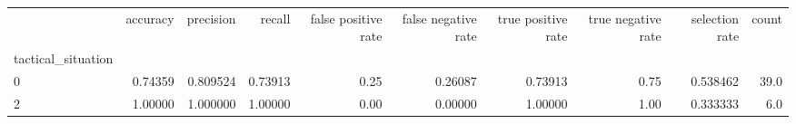 \begin{tabular}{lrrrrrrrrr}
\toprule
{} &  accuracy &  precision &   recall &  false positive rate &  false negative rate &  true positive rate &  true negative rate &  selection rate &  count \\
tactical\_situation &           &            &          &                      &                      &                     &                     &                 &        \\
\midrule
0                  &   0.74359 &   0.809524 &  0.73913 &                 0.25 &              0.26087 &             0.73913 &                0.75 &        0.538462 &   39.0 \\
2                  &   1.00000 &   1.000000 &  1.00000 &                 0.00 &              0.00000 &             1.00000 &                1.00 &        0.333333 &    6.0 \\
\bottomrule
\end{tabular}
